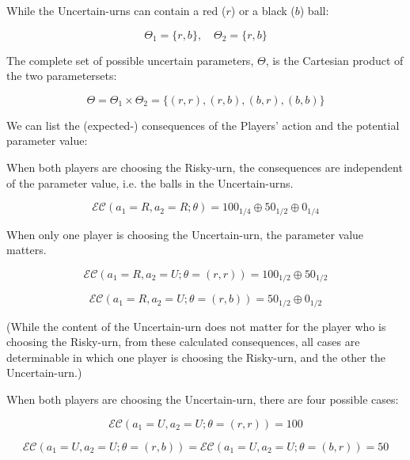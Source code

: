 \documentclass{article}
\theoremstyle{definition}
\begin{document}
While the Uncertain-urns can contain a red ($r$) or a black ($b$) ball:

\begin{equation}
    \Theta_1 = \{ r, b \}, \quad
    \Theta_2 = \{ r, b \}
\end{equation}

The complete set of possible uncertain parameters, $\Theta$, is the Cartesian product of the two parametersets:

\begin{equation}
    \Theta = \Theta_1 \times \Theta_2 = \{ (r,r), (r,b), (b,r), (b, b) \}
\end{equation}

We can list the (expected-) consequences of the Players' action and the potential parameter value:

When both players are choosing the Risky-urn, the consequences are independent of the parameter value, i.e. the balls in the Uncertain-urns.

\begin{equation}
    \mathcal{EC}(a_1=R,a_2=R;\theta) 
    =
    100_{1/4} \oplus 50_{1/2} \oplus 0_{1/4}
\end{equation}

When only one player is choosing the Uncertain-urn, the parameter value matters.

\begin{equation}
    \mathcal{EC}(a_1=R,a_2=U;\theta=(r,r)) 
    =
    100_{1/2} \oplus 50_{1/2}
\end{equation}

\begin{equation}
    \mathcal{EC}(a_1=R,a_2=U;\theta=(r,b)) 
    =
    50_{1/2} \oplus 0_{1/2}
\end{equation}

(While the content of the Uncertain-urn does not matter for the player who is choosing the Risky-urn, from these calculated consequences, all cases are determinable in which one player is choosing the Risky-urn, and the other the Uncertain-urn.)

When both players are choosing the Uncertain-urn, there are four possible cases:

\begin{equation}
    \mathcal{EC}(a_1=U,a_2=U;\theta=(r,r)) 
    =
    100
\end{equation}

\begin{equation}
    \mathcal{EC}(a_1=U,a_2=U;\theta=(r,b)) 
    =
    \mathcal{EC}(a_1=U,a_2=U;\theta=(b,r)) 
    =
    50
\end{equation}
\end{document}
